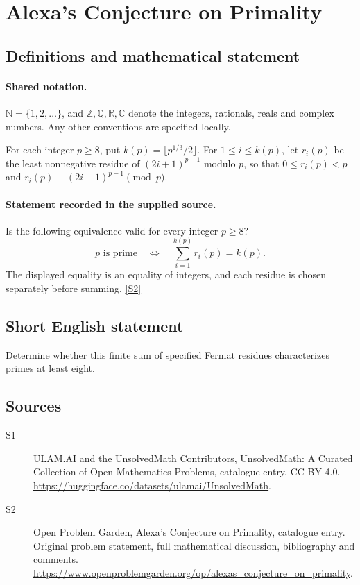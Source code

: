 \documentclass[11pt]{article}
\newcommand{\sref}[2]{\hyperlink{source:#1:#2}{[S#2]}}
\begin{document}
\section{Alexa's Conjecture on Primality}\label{statement}

\subsection{Definitions and mathematical statement}

\paragraph{Shared notation.}$\mathbb N=\{1,2,\ldots\}$, and $\mathbb Z,\mathbb Q,\mathbb R,\mathbb C$ denote the integers, rationals, reals and complex numbers. Any other conventions are specified locally.


For each integer $p\ge8$, put $k(p)=\lfloor p^{1/3}/2\rfloor$. For $1\le i\le k(p)$, let $r_i(p)$ be the least nonnegative residue of $(2i+1)^{p-1}$ modulo $p$, so that $0\le r_i(p)<p$ and $r_i(p)\equiv(2i+1)^{p-1}\pmod p$.
\paragraph{Statement recorded in the supplied source.}
Is the following equivalence valid for every integer $p\ge8$?
\[
 p\text{ is prime}\quad\Longleftrightarrow\quad
 \sum_{i=1}^{k(p)}r_i(p)=k(p).
\]
The displayed equality is an equality of integers, and each residue is chosen separately before summing. \sref{statement}{2}
\subsection{Short English statement}
Determine whether this finite sum of specified Fermat residues characterizes primes at least eight.
\subsection{Sources}
\begin{description}
\item[\hypertarget{source:statement:1}{S1}] ULAM.AI and the UnsolvedMath Contributors, UnsolvedMath: A Curated Collection of Open Mathematics Problems, catalogue entry. CC BY 4.0. \url{https://huggingface.co/datasets/ulamai/UnsolvedMath}.
\item[\hypertarget{source:statement:2}{S2}] Open Problem Garden, Alexa's Conjecture on Primality, catalogue entry. Original problem statement, full mathematical discussion, bibliography and comments. \url{https://www.openproblemgarden.org/op/alexas_conjecture_on_primality}.
\end{description}
\label{end:statement}
\end{document}
